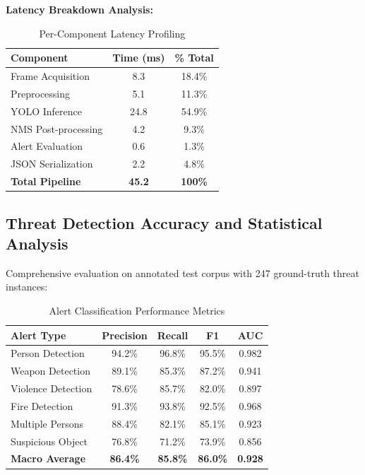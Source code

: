\documentclass[conference]{IEEEtran}
\begin{document}
\textbf{Latency Breakdown Analysis:}
\begin{table}[htbp]
\caption{Per-Component Latency Profiling}
\begin{center}
\begin{tabular}{|l|c|c|}
\hline
\textbf{Component} & \textbf{Time (ms)} & \textbf{\% Total} \\
\hline
Frame Acquisition & 8.3 & 18.4\% \\
\hline
Preprocessing & 5.1 & 11.3\% \\
\hline
YOLO Inference & 24.8 & 54.9\% \\
\hline
NMS Post-processing & 4.2 & 9.3\% \\
\hline
Alert Evaluation & 0.6 & 1.3\% \\
\hline
JSON Serialization & 2.2 & 4.8\% \\
\hline
\textbf{Total Pipeline} & \textbf{45.2} & \textbf{100\%} \\
\hline
\end{tabular}
\label{tab:latency}
\end{center}
\end{table}

\subsection{Threat Detection Accuracy and Statistical Analysis}
Comprehensive evaluation on annotated test corpus with 247 ground-truth threat instances:

\begin{table}[htbp]
\caption{Alert Classification Performance Metrics}
\begin{center}
\begin{tabular}{|l|c|c|c|c|}
\hline
\textbf{Alert Type} & \textbf{Precision} & \textbf{Recall} & \textbf{F1} & \textbf{AUC} \\
\hline
Person Detection & 94.2\% & 96.8\% & 95.5\% & 0.982 \\
\hline
Weapon Detection & 89.1\% & 85.3\% & 87.2\% & 0.941 \\
\hline
Violence Detection & 78.6\% & 85.7\% & 82.0\% & 0.897 \\
\hline
Fire Detection & 91.3\% & 93.8\% & 92.5\% & 0.968 \\
\hline
Multiple Persons & 88.4\% & 82.1\% & 85.1\% & 0.923 \\
\hline
Suspicious Object & 76.8\% & 71.2\% & 73.9\% & 0.856 \\
\hline
\textbf{Macro Average} & \textbf{86.4\%} & \textbf{85.8\%} & \textbf{86.0\%} & \textbf{0.928} \\
\hline
\end{tabular}
\label{tab:alerts}
\end{center}
\end{table}
\end{document}
